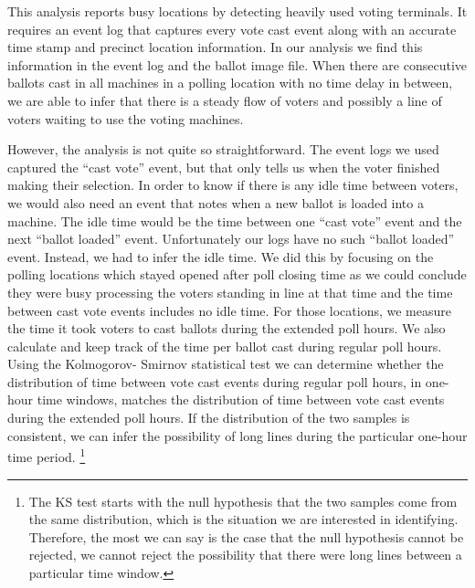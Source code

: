 This analysis reports busy locations by detecting heavily used voting terminals. It requires an event log that captures every vote cast event along with an accurate time stamp and precinct location information. In our analysis we find this information in the event log and the ballot image file. When there are consecutive ballots cast in all machines in a polling location with no time delay in between, we are able to infer that there is a steady flow of voters and possibly a line of voters waiting to use the voting machines. 

However, the analysis is not quite so straightforward. The event logs we used captured the \textquotedblleft cast vote'' event, but that only tells us when the voter finished making their selection. In order to know if there is any idle time between voters, we would also need an event that notes when a new ballot is loaded into a machine. The idle time would be the time between one \textquotedblleft cast vote'' event and the next \textquotedblleft ballot loaded'' event. Unfortunately our logs have no such \textquotedblleft ballot loaded'' event. Instead, we had to infer the idle time. We did this by focusing on the polling locations which stayed opened after poll closing time as we could conclude they were busy processing the voters standing in line at that time and the time between cast vote events includes no idle time. For those locations, we measure the time it took voters to cast ballots during the extended poll hours. We also calculate and keep track of the time per ballot cast during regular poll hours. Using the Kolmogorov- Smirnov statistical test we can determine whether the distribution of time between vote cast events during regular poll hours, in one-hour time windows, matches the distribution of time between vote cast events during the extended poll hours. If the distribution of the two samples is consistent, we can infer the possibility of long lines during the particular one-hour time period. \footnote{The KS test starts with the null hypothesis that the two samples come from the same distribution, which is the situation we are interested in identifying. Therefore, the most we can say is the case that the null hypothesis cannot be rejected, we cannot reject the possibility that there were long lines between a particular time window.}
